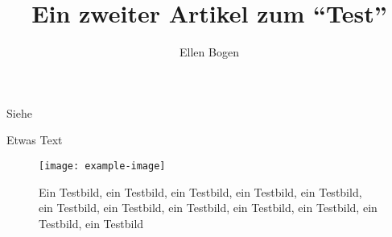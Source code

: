 \documentclass{dtk2}
\author{Ellen Bogen}
\begin{document}
\title{Ein zweiter Artikel zum "`Test"'}

\maketitle

Siehe~\cite{lamport:handbuch}

Etwas Text

\begin{figure} \centering
  \texttt{[image: example-image]}
  \caption{Ein Testbild, ein Testbild, ein Testbild, ein Testbild, ein
  Testbild, ein Testbild, ein Testbild, ein Testbild, ein Testbild, ein
  Testbild, ein Testbild, ein Testbild}
\end{figure}


\end{document}
